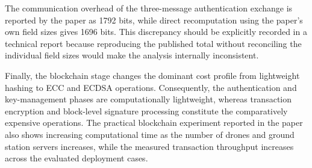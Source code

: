 The communication overhead of the three-message authentication exchange is
reported by the paper as 1792 bits, while direct recomputation using the paper's
own field sizes gives 1696 bits. This discrepancy should be explicitly recorded
in a technical report because reproducing the published total without
reconciling the individual field sizes would make the analysis internally
inconsistent.

Finally, the blockchain stage changes the dominant cost profile from lightweight
hashing to ECC and ECDSA operations. Consequently, the authentication and
key-management phases are computationally lightweight, whereas transaction
encryption and block-level signature processing constitute the comparatively
expensive operations. The practical blockchain experiment reported in the paper
also shows increasing computational time as the number of drones and ground
station servers increases, while the measured transaction throughput increases
across the evaluated deployment cases.
